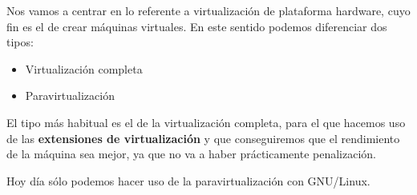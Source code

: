 Nos vamos a centrar en lo referente a virtualización de plataforma hardware, cuyo fin es el de crear máquinas virtuales. En este sentido podemos diferenciar dos tipos:

\begin{itemize}
    \item Virtualización completa
    \item Paravirtualización
\end{itemize}


El tipo más habitual es el de la virtualización completa, para el que hacemos uso de las \textbf{extensiones de virtualización} y que  conseguiremos que el rendimiento de la máquina sea mejor, ya que no va a haber prácticamente penalización.

Hoy día sólo podemos hacer uso de la paravirtualización con GNU/Linux.


